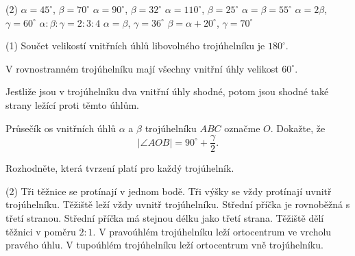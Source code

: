 \documentclass[12pt,a4paper]{article}
\begin{document}

\begin{exercise}

    \begin{tasks}(2)
        \task $\alpha=45^\circ$, $\beta=70^\circ$
        \task $\alpha=90^\circ$, $\beta=32^\circ$
        \task $\alpha=110^\circ$, $\beta=25^\circ$
        \task $\alpha=\beta=55^\circ$
        \task $\alpha=2\beta$, $\gamma=60^\circ$
        \task $\alpha:\beta:\gamma=2:3:4$
        \task $\alpha=\beta$, $\gamma=36^\circ$
        \task $\beta=\alpha+20^\circ$, $\gamma=70^\circ$
    \end{tasks}

\end{exercise}



\begin{exercise}

    \begin{tasks}(1)
        \task Součet velikostí vnitřních úhlů libovolného trojúhelníku je $180^\circ$.

        \task V rovnostranném trojúhelníku mají všechny vnitřní úhly velikost $60^\circ$.

        \task Jestliže jsou v trojúhelníku dva vnitřní úhly shodné, potom jsou shodné také strany ležící proti těmto úhlům.

        \task Průsečík os vnitřních úhlů $\alpha$ a $\beta$ trojúhelníku $ABC$
        označme $O$. Dokažte, že
        \[
            |\angle AOB|=90^\circ+\frac{\gamma}{2}.
        \]
    \end{tasks}

\end{exercise}



\begin{exercise}

    Rozhodněte, která tvrzení platí pro každý trojúhelník.

    \begin{tasks}(2)
        \task Tři těžnice se protínají v jednom bodě.
        \task Tři výšky se vždy protínají uvnitř trojúhelníku.
        \task Těžiště leží vždy uvnitř trojúhelníku.
        \task Střední příčka je rovnoběžná s třetí stranou.
        \task Střední příčka má stejnou délku jako třetí strana.
        \task Těžiště dělí těžnici v poměru $2:1$.
        \task V pravoúhlém trojúhelníku leží ortocentrum ve vrcholu pravého úhlu.
        \task V tupoúhlém trojúhelníku leží ortocentrum vně trojúhelníku.
    \end{tasks}

\end{exercise}
\end{document}
